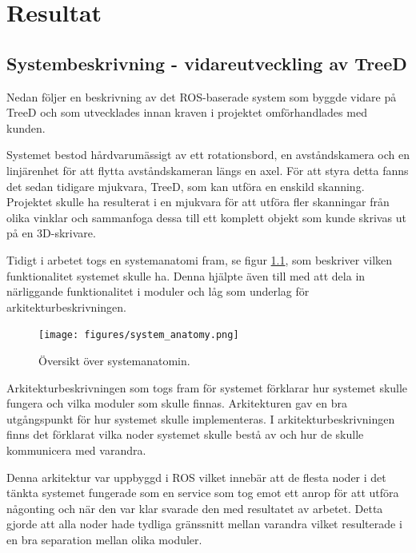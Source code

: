 \chapter{Resultat}
\label{cha:results}

\section{Systembeskrivning - vidareutveckling av TreeD}
\label{cha:results-systembeskrivning-treed}

Nedan följer en beskrivning av det ROS-baserade system som byggde vidare på TreeD och som utvecklades innan kraven i projektet omförhandlades med kunden.

Systemet bestod hårdvarumässigt av ett rotationsbord, en avståndskamera och en linjärenhet för att flytta avståndskameran längs en axel. För att styra detta fanns det sedan tidigare mjukvara, TreeD, som kan utföra en enskild skanning. Projektet skulle ha resulterat i en mjukvara för att utföra fler skanningar från olika vinklar och sammanfoga dessa till ett komplett objekt som kunde skrivas ut på en 3D-skrivare.

Tidigt i arbetet togs en systemanatomi fram, se figur \ref{fig:system_anatomy}, som beskriver vilken funktionalitet systemet skulle ha. Denna hjälpte även till med att dela in närliggande funktionalitet i moduler och låg som underlag för arkitekturbeskrivningen.

\begin{figure}[H]
	\centering{\tiny }
	\texttt{[image: figures/system\_anatomy.png]}
	\caption{Översikt över systemanatomin.}
	\label{fig:system_anatomy}
\end{figure}

Arkitekturbeskrivningen som togs fram för systemet förklarar hur systemet skulle fungera och vilka moduler som skulle finnas. Arkitekturen gav en bra utgångspunkt för hur systemet skulle implementeras. I arkitekturbeskrivningen finns det förklarat vilka noder systemet skulle bestå av och hur de skulle kommunicera med varandra.

Denna arkitektur var uppbyggd i ROS vilket innebär att de flesta noder i det tänkta systemet fungerade som en service som tog emot ett anrop för att utföra någonting och när den var klar svarade den med resultatet av arbetet. Detta gjorde att alla noder hade tydliga gränssnitt mellan varandra vilket resulterade i en bra separation mellan olika moduler.

